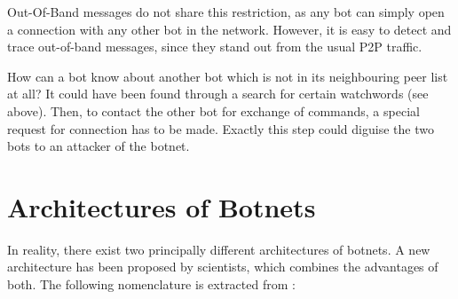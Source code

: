 \documentclass{llncs}
\begin{document}
\begin{itemize}
Out-Of-Band messages do not share this restriction, as any bot can
simply open a connection with any other bot in the network. However,
it is easy to detect and trace out-of-band messages, since they stand
out from the usual P2P traffic. 

How can a bot know about another bot which is not in its neighbouring
peer list at all? It could have been found through a search for
certain watchwords (see above). Then, to contact the other bot for
exchange of commands, a special request for connection has to be
made. Exactly this step could diguise the two bots to an attacker of
the botnet.
\end{itemize}


\section{Architectures of Botnets}
\label{architecture}
In reality, there exist two principally different architectures of
botnets. A new architecture has been proposed by scientists, which
combines the advantages of both. The following nomenclature is
extracted from \cite{steggink2007detection}:
\end{document}
